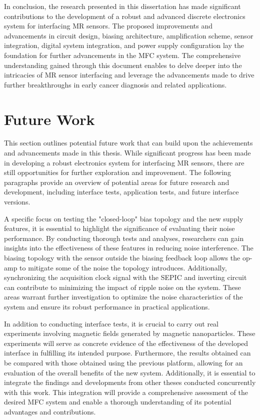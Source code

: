 In conclusion, the research presented in this dissertation has made significant contributions to the development of a robust and advanced discrete electronics system for interfacing \ac{MR} sensors. The proposed improvements and advancements in circuit design, biasing architecture, amplification scheme, sensor integration, digital system integration, and power supply configuration lay the foundation for further advancements in  the \ac{MFC} system. The comprehensive understanding gained through this document enables to delve deeper into the intricacies of \ac{MR} sensor interfacing and leverage the advancements made to drive further breakthroughs in early cancer diagnosis and related applications.

\section{Future Work}
\label{section:conclusion-future}

This section outlines potential future work that can build upon the achievements and advancements made in this thesis. While significant progress has been made in developing a robust electronics system for interfacing \ac{MR} sensors, there are still opportunities for further exploration and improvement. The following paragraphs provide an overview of potential areas for future research and development, including interface tests, application tests, and future interface versions.

A specific focus on testing the "closed-loop" bias topology and the new supply features, it is essential to highlight the significance of evaluating their noise performance. By conducting thorough tests and analyses, researchers can gain insights into the effectiveness of these features in reducing noise interference. The biasing topology with the sensor outside the biasing feedback loop allows the op-amp to mitigate some of the noise the topology introduces. Additionally, synchronizing the acquisition clock signal with the \ac{SEPIC} and inverting circuit can contribute to minimizing the impact of ripple noise on the system. These areas warrant further investigation to optimize the noise characteristics of the system and ensure its robust performance in practical applications.

In addition to conducting interface tests, it is crucial to carry out real experiments involving magnetic fields generated by magnetic nanoparticles. These experiments will serve as concrete evidence of the effectiveness of the developed interface in fulfilling its intended purpose. Furthermore, the results obtained can be compared with those obtained using the previous platform, allowing for an evaluation of the overall benefits of the new system. Additionally, it is essential to integrate the findings and developments from other theses conducted concurrently with this work. This integration will provide a comprehensive assessment of the desired \ac{MFC} system and enable a thorough understanding of its potential advantages and contributions.

